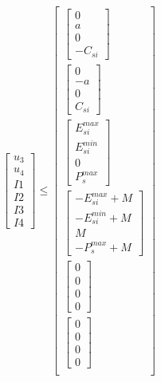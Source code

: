 \documentclass[11pt]{article} %
\begin{document}
\begin{align}
\begin{bmatrix}
        u_3\\
        u_4\\
        I1\\
        I2\\
        I3\\
        I4 
    \end{bmatrix} \leq
    \begin{bmatrix}
        \begin{bmatrix}
            0\\
            a\\
            0\\
            -C_{si}
        \end{bmatrix}\\
        \begin{bmatrix}
            0\\
            -a\\
            0\\
            C_{si}
        \end{bmatrix}\\
        \begin{bmatrix}
            E_{si}^{max}\\
            E_{si}^{min}\\
            0\\
            P_{s}^{max}
        \end{bmatrix}\\
        \begin{bmatrix}
            -E_{si}^{max} + M\\
            -E_{si}^{min} + M\\
            M\\
            -P_{s}^{max} + M
        \end{bmatrix}\\
        \begin{bmatrix}
            0\\
            0\\
            0\\
            0
        \end{bmatrix}\\
        \begin{bmatrix}
            0\\
            0\\
            0\\
            0
        \end{bmatrix}\\
    \end{bmatrix} 
\end{align}
\end{document}
